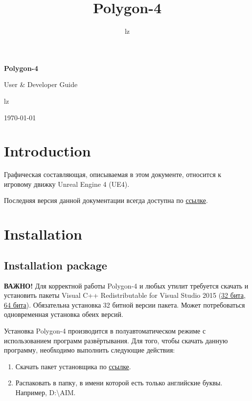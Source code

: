 \documentclass[a4paper,12pt]{report}
\author{lz}
\title{Polygon-4}
\newcommand{\ue}{UE4\xspace}
\newcommand{\pf}{Polygon-4\xspace}
\begin{document}
\large %

\begin{titlepage}
\centering
\vspace*{7cm}
{\huge\bfseries Polygon-4\par}
\vspace{1.5cm}
{\Large User \& Developer Guide\par}
\vspace{1.5cm}
lz
\vfill
{\today\par}
\end{titlepage}
\setcounter{page}{2}
\tableofcontents

\chapter*{Introduction}

Графическая составляющая, описываемая в этом документе, относится к игровому движку Unreal Engine 4 (\ue).

Последняя версия данной документации всегда доступна по \href{https://www.dropbox.com/s/ipnakg5civ0xp0g/Polygon4_ru.pdf?dl=1}{ссылке}.

\chapter{Installation}

\section{Installation package}


\textbf{ВАЖНО!} Для корректной работы \pf и любых утилит требуется скачать и установить пакеты Visual C++ Redistributable for Visual Studio 2015 (\href{https://download.microsoft.com/download/9/3/F/93FCF1E7-E6A4-478B-96E7-D4B285925B00/vc_redist.x86.exe}{32 бита}, \href{https://download.microsoft.com/download/9/3/F/93FCF1E7-E6A4-478B-96E7-D4B285925B00/vc_redist.x64.exe}{64 бита}).
Обязательна установка 32 битной версии пакета.
Может потребоваться одновременная установка обеих версий.

Установка \pf производится в полуавтоматическом режиме с использованием программ развёртывания.
Для того, чтобы скачать данную программу, необходимо выполнить следующие действия:

\begin{enumerate}
\item Скачать пакет установщика по \href{https://www.dropbox.com/s/0zhbgb1ftspcv9w/polygon4.zip?dl=1}{ссылке}.
\item Распаковать в папку, в имени которой есть только английские буквы. Например, D:\backslash AIM.
\end{enumerate}
\end{document}
